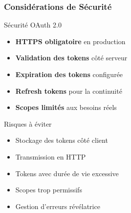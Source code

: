 \documentclass[aspectratio=169]{beamer}
\begin{document}
\begin{frame}
    \frametitle{Considérations de Sécurité}
    \begin{block}{Sécurité OAuth 2.0}
        \begin{itemize}
            \item \textbf{HTTPS obligatoire} en production
            \item \textbf{Validation des tokens} côté serveur
            \item \textbf{Expiration des tokens} configurée
            \item \textbf{Refresh tokens} pour la continuité
            \item \textbf{Scopes limités} aux besoins réels
        \end{itemize}
    \end{block}
    
    \begin{alertblock}{Risques à éviter}
        \begin{itemize}
            \item Stockage des tokens côté client
            \item Transmission en HTTP
            \item Tokens avec durée de vie excessive
            \item Scopes trop permissifs
            \item Gestion d'erreurs révélatrice
        \end{itemize}
    \end{alertblock}
\end{frame}
\end{document}
